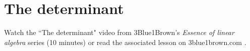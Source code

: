 \section{The determinant}

Watch the ``The determinant" video from 3Blue1Brown's \textit{Essence of linear
algebra} series (10 minutes) or read the associated lesson on 3blue1brown.com
\cite{bib:3b1b_linalg_the_determinant}.
